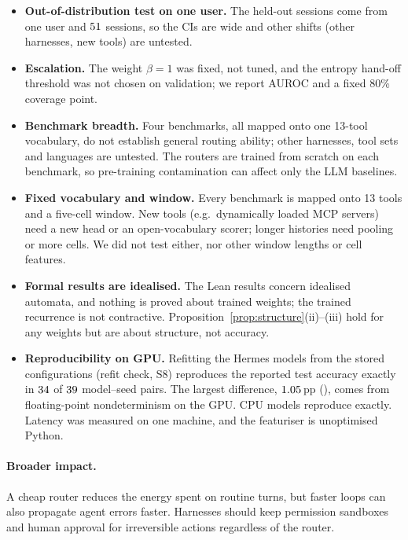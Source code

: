 \documentclass[10pt]{article}
\begin{document}
\begin{itemize}[leftmargin=1.2em, itemsep=0.1em]
  \item \textbf{Out-of-distribution test on one user.} The held-out sessions come from one user and $51$ sessions, so the CIs are wide and other shifts (other harnesses, new tools) are untested.
  \item \textbf{Escalation.} The weight $\beta{=}1$ was fixed, not tuned, and the entropy hand-off threshold was not chosen on validation; we report AUROC and a fixed 80\% coverage point.
  \item \textbf{Benchmark breadth.} Four benchmarks, all mapped onto one 13-tool vocabulary, do not establish general routing ability; other harnesses, tool sets and languages are untested. The routers are trained from scratch on each benchmark, so pre-training contamination can affect only the LLM baselines.
  \item \textbf{Fixed vocabulary and window.} Every benchmark is mapped onto 13 tools and a five-cell window. New tools (e.g.\ dynamically loaded MCP servers) need a new head or an open-vocabulary scorer; longer histories need pooling or more cells. We did not test either, nor other window lengths or cell features.
  \item \textbf{Formal results are idealised.} The Lean results concern idealised automata, and nothing is proved about trained weights; the trained recurrence is not contractive. Proposition~\ref{prop:structure}(ii)--(iii) hold for any weights but are about structure, not accuracy.
  \item \textbf{Reproducibility on GPU.} Refitting the Hermes models from the stored configurations (refit check, S8) reproduces the reported test accuracy exactly in $34$ of $39$ model--seed pairs. The largest difference, $1.05$\,pp (\numRRefitMaxModel{}), comes from floating-point nondeterminism on the GPU. CPU models reproduce exactly. Latency was measured on one machine, and the featuriser is unoptimised Python.
\end{itemize}
\paragraph{Broader impact.} A cheap router reduces the energy spent on routine turns, but faster loops can also propagate agent errors faster. Harnesses should keep permission sandboxes and human approval for irreversible actions regardless of the router.
\end{document}
